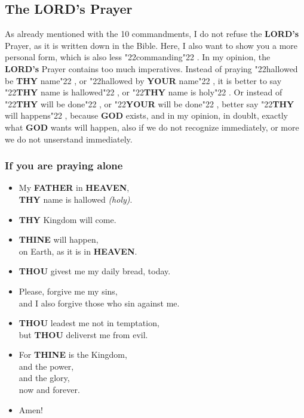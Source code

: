 \documentclass[10pt,a5paper]{article}
\newcommand{\God}[0]{\textbf{GOD}}
\newcommand{\Father}[0]{\textbf{FATHER}}
\newcommand{\Heaven}[0]{\textbf{HEAVEN}}
\newcommand{\Lords}[0]{\textbf{LORD's}}
\newcommand{\Thine}[0]{\textbf{THINE}}
\newcommand{\Thou}[0]{\textbf{THOU}}
\newcommand{\Thy}[0]{\textbf{THY}}
\newcommand{\Your}[0]{\textbf{YOUR}}
\newcommand{\q}[1]{\char"22{#1}\char"22 }
\begin{document}
	\subsection{The {\Lords} Prayer}
		As already mentioned with the 10 commandments,
		I do not refuse the {\Lords} Prayer,
		as it is written down in the Bible.
		Here,
		I also want to show you a more personal form,
		which is also less \q{commanding}.
		In my opinion,
		the {\Lords} Prayer contains too much imperatives.
		Instead of praying \q{hallowed be {\Thy} name},
		or \q{hallowed by {\Your} name},
		it is better to say \q{{\Thy} name is hallowed},
		or \q{{\Thy} name is holy}.
		Or instead of \q{{\Thy} will be done},
		or \q{{\Your} will be done},
		better say \q{{\Thy} will happens},
		because {\God} exists,
		and in my opinion,
		in doublt,
		exactly what {\God} wants will happen,
		also if we do not recognize immediately,
		or more we do not unserstand immediately.

	\subsubsection{If you are praying alone}
		\begin{itemize}[nosep]
			\item	My {\Father} in {\Heaven},
			\\		{\Thy} name is hallowed \textit{(holy)}.
			\item	{\Thy} Kingdom will come.
			\item	{\Thine} will happen,
			\\		on Earth,
					as it is in {\Heaven}.
			\item	{\Thou} givest me my daily bread,
					today.
			\item	Please,
					forgive me my sins,
			\\		and I also forgive those who sin against me.
			\item	{\Thou} leadest me not in temptation,
			\\		but {\Thou} deliverst me from evil.
			\item	For {\Thine} is the Kingdom,
			\\		and the power,
			\\		and the glory,
			\\		now and forever.
			\item	Amen!
	\end{itemize}
	
\end{document}
